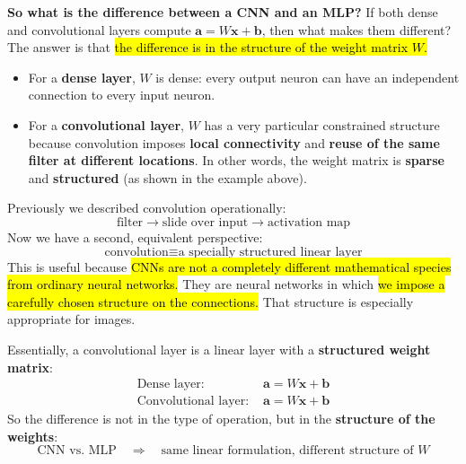 \newpage

\noindent
\textcolor{Green3}{ \textbf{So what is the difference between a CNN and an MLP?}} If both dense and convolutional layers compute $\mathbf{a} = W\mathbf{x} + \mathbf{b}$, then what makes them different? The answer is that \hl{the difference is in the structure of the weight matrix $W$.}
\begin{itemize}
    \item For a \textbf{dense layer}, $W$ is dense: every output neuron can have an independent connection to every input neuron.


    \item For a \textbf{convolutional layer}, $W$ has a very particular constrained structure because convolution imposes \textbf{local connectivity} and \textbf{reuse of the same filter at different locations}. In other words, the weight matrix is \textbf{sparse} and \textbf{structured} (as shown in the example above).
\end{itemize}
Previously we described convolution operationally:
\begin{equation*}
    \text{filter} \to \text{slide over input} \to \text{activation map}
\end{equation*}
Now we have a second, equivalent perspective:
\begin{equation*}
    \text{convolution} \equiv \text{a specially structured linear layer}
\end{equation*}
This is useful because \hl{CNNs are not a completely different mathematical species from ordinary neural networks.} They are neural networks in which \hl{we impose a carefully chosen structure on the connections.} That structure is especially appropriate for images.

\highspace
\begin{takeawaysbox}
    Essentially, a convolutional layer is a linear layer with a \textbf{structured weight matrix}:
    \begin{align*}
        \text{Dense layer: } & \mathbf{a} = W\mathbf{x} + \mathbf{b} \\
        \text{Convolutional layer: } & \mathbf{a} = W\mathbf{x} + \mathbf{b}
    \end{align*}
    So the difference is not in the type of operation, but in the \textbf{structure of the weights}:
    \begin{equation*}
        \text{CNN vs. MLP} \quad \Rightarrow \quad \text{same linear formulation, different structure of } W
    \end{equation*}
\end{takeawaysbox}